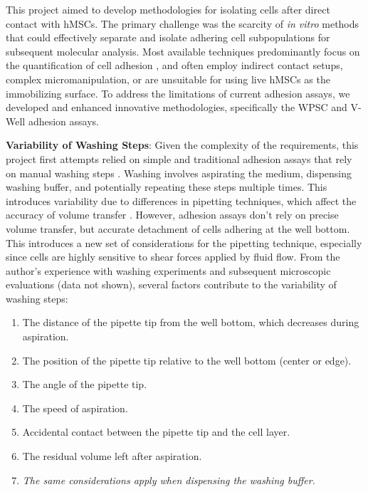 



%
\label{sec:discussion_novel_methods}%
This project aimed to develop methodologies for isolating cells after direct
contact with \acp{hMSC}. The primary challenge was the scarcity of \textit{in
    vitro} methods that could effectively separate and isolate adhering cell
subpopulations for subsequent molecular analysis. Most available techniques
predominantly focus on the quantification of cell adhesion
\cite{khaliliReviewCellAdhesion2015, kashefQuantitativeMethodsAnalyzing2015},
and often employ indirect contact setups, complex micromanipulation, or are
unsuitable for using live \acp{hMSC} as the immobilizing surface. To address the
limitations of current adhesion assays, we developed and enhanced innovative
methodologies, specifically the \acf{WPSC} and V-Well adhesion assays.

\textbf{Variability of Washing Steps}: Given the complexity of
the requirements, this project first attempts relied on simple and traditional
adhesion assays that rely on manual washing steps
\cite{humphriesCellAdhesionAssays2009}. Washing involves aspirating the medium,
dispensing washing buffer, and potentially repeating these steps multiple times.
This introduces variability due to differences in pipetting techniques, which
affect the accuracy of volume transfer \cite{guanAssessingVariationsManual2023,
    pushparajRevisitingMicropipettingTechniques2020}. However, adhesion assays don't
rely on precise volume transfer, but accurate detachment of cells adhering at
the well bottom. This introduces a new set of considerations for the pipetting
technique, especially since cells are highly sensitive to shear forces applied
by fluid flow. From the author's experience with washing experiments and
subsequent microscopic evaluations (data not shown), several factors contribute
to the variability of washing steps:
\begin{enumerate}
    \item The distance of the pipette tip from the well bottom, which decreases during aspiration.
    \item The position of the pipette tip relative to the well bottom (center or edge).
    \item The angle of the pipette tip.
    \item The speed of aspiration.
    \item Accidental contact between the pipette tip and the cell layer.
    \item The residual volume left after aspiration.
    \item \textit{The same considerations apply when dispensing the washing buffer.}
\end{enumerate}


